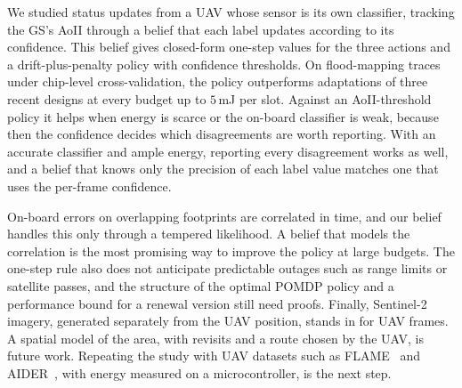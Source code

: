 We studied status updates from a UAV whose sensor is its own classifier, tracking the GS's AoII through a belief that each label updates according to its confidence. This belief gives closed-form one-step values for the three actions and a drift-plus-penalty policy with confidence thresholds. On flood-mapping traces under chip-level cross-validation, the policy outperforms adaptations of three recent designs at every budget up to $5$\,mJ per slot. Against an AoII-threshold policy it helps when energy is scarce or the on-board classifier is weak, because then the confidence decides which disagreements are worth reporting. With an accurate classifier and ample energy, reporting every disagreement works as well, and a belief that knows only the precision of each label value matches one that uses the per-frame confidence.

On-board errors on overlapping footprints are correlated in time, and our belief handles this only through a tempered likelihood. A belief that models the correlation is the most promising way to improve the policy at large budgets. The one-step rule also does not anticipate predictable outages such as range limits or satellite passes, and the structure of the optimal POMDP policy and a performance bound for a renewal version still need proofs. Finally, Sentinel-2 imagery, generated separately from the UAV position, stands in for UAV frames. A spatial model of the area, with revisits and a route chosen by the UAV, is future work. Repeating the study with UAV datasets such as FLAME~\cite{shamsoshoara2021flame} and AIDER~\cite{kyrkou2020aider}, with energy measured on a microcontroller, is the next step.
